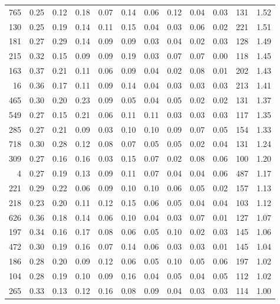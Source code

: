 \begin{tabular}{rrrrrrrrrrll}
          765 & 0.25 & 0.12 & 0.18 & 0.07 & 0.14 & 0.06 & 0.12 & 0.04 & 0.03 & 131 &  1.52 \\
          130 & 0.25 & 0.19 & 0.14 & 0.11 & 0.15 & 0.04 & 0.03 & 0.06 & 0.02 & 221 &  1.51 \\
          181 & 0.27 & 0.29 & 0.14 & 0.09 & 0.09 & 0.03 & 0.04 & 0.02 & 0.03 & 128 &  1.49 \\
          215 & 0.32 & 0.15 & 0.09 & 0.09 & 0.19 & 0.03 & 0.07 & 0.07 & 0.00 & 118 &  1.45 \\
          163 & 0.37 & 0.21 & 0.11 & 0.06 & 0.09 & 0.04 & 0.02 & 0.08 & 0.01 & 202 &  1.43 \\
           16 & 0.36 & 0.17 & 0.11 & 0.09 & 0.14 & 0.04 & 0.03 & 0.03 & 0.03 & 213 &  1.41 \\
          465 & 0.30 & 0.20 & 0.23 & 0.09 & 0.05 & 0.04 & 0.05 & 0.02 & 0.02 & 131 &  1.37 \\
          549 & 0.27 & 0.15 & 0.21 & 0.06 & 0.11 & 0.11 & 0.03 & 0.03 & 0.03 & 117 &  1.35 \\
          285 & 0.27 & 0.21 & 0.09 & 0.03 & 0.10 & 0.10 & 0.09 & 0.07 & 0.05 & 154 &  1.33 \\
          718 & 0.30 & 0.28 & 0.12 & 0.08 & 0.07 & 0.05 & 0.05 & 0.02 & 0.04 & 131 &  1.24 \\
          309 & 0.27 & 0.16 & 0.16 & 0.03 & 0.15 & 0.07 & 0.02 & 0.08 & 0.06 & 100 &  1.20 \\
            4 & 0.27 & 0.19 & 0.13 & 0.09 & 0.11 & 0.07 & 0.04 & 0.04 & 0.06 & 487 &  1.17 \\
          221 & 0.29 & 0.22 & 0.06 & 0.09 & 0.10 & 0.10 & 0.06 & 0.05 & 0.02 & 157 &  1.13 \\
          218 & 0.23 & 0.20 & 0.11 & 0.12 & 0.15 & 0.06 & 0.05 & 0.04 & 0.04 & 103 &  1.12 \\
          626 & 0.36 & 0.18 & 0.14 & 0.06 & 0.10 & 0.04 & 0.03 & 0.07 & 0.01 & 127 &  1.07 \\
          197 & 0.34 & 0.16 & 0.17 & 0.08 & 0.06 & 0.05 & 0.10 & 0.02 & 0.03 & 145 &  1.06 \\
          472 & 0.30 & 0.19 & 0.16 & 0.07 & 0.14 & 0.06 & 0.03 & 0.03 & 0.01 & 145 &  1.04 \\
          186 & 0.28 & 0.20 & 0.09 & 0.12 & 0.06 & 0.05 & 0.10 & 0.05 & 0.06 & 197 &  1.02 \\
          104 & 0.28 & 0.19 & 0.10 & 0.09 & 0.16 & 0.04 & 0.05 & 0.04 & 0.05 & 112 &  1.02 \\
          265 & 0.33 & 0.13 & 0.12 & 0.16 & 0.08 & 0.09 & 0.04 & 0.03 & 0.03 & 114 &  1.00 \\

\end{tabular}
